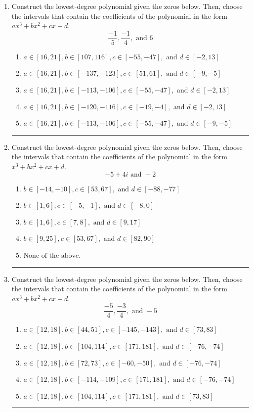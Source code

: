 \documentclass[14pt]{extbook}
\newcommand{\litem}[1]{\item#1\hspace*{-1cm}\rule{\textwidth}{0.4pt}}
\begin{document}
\begin{enumerate}
\litem{
Construct the lowest-degree polynomial given the zeros below. Then, choose the intervals that contain the coefficients of the polynomial in the form $ax^3+bx^2+cx+d$.\[ \frac{-1}{5}, \frac{-1}{4}, \text{ and } 6 \]\begin{enumerate}[label=\Alph*.]
\item \( a \in [16, 21], b \in [107, 116], c \in [-55, -47], \text{ and } d \in [-2, 13] \)
\item \( a \in [16, 21], b \in [-137, -123], c \in [51, 61], \text{ and } d \in [-9, -5] \)
\item \( a \in [16, 21], b \in [-113, -106], c \in [-55, -47], \text{ and } d \in [-2, 13] \)
\item \( a \in [16, 21], b \in [-120, -116], c \in [-19, -4], \text{ and } d \in [-2, 13] \)
\item \( a \in [16, 21], b \in [-113, -106], c \in [-55, -47], \text{ and } d \in [-9, -5] \)

\end{enumerate} }
\litem{
Construct the lowest-degree polynomial given the zeros below. Then, choose the intervals that contain the coefficients of the polynomial in the form $x^3+bx^2+cx+d$.\[ -5 + 4 i \text{ and } -2 \]\begin{enumerate}[label=\Alph*.]
\item \( b \in [-14, -10], c \in [53, 67], \text{ and } d \in [-88, -77] \)
\item \( b \in [1, 6], c \in [-5, -1], \text{ and } d \in [-8, 0] \)
\item \( b \in [1, 6], c \in [7, 8], \text{ and } d \in [9, 17] \)
\item \( b \in [9, 25], c \in [53, 67], \text{ and } d \in [82, 90] \)
\item \( \text{None of the above.} \)

\end{enumerate} }
\litem{
Construct the lowest-degree polynomial given the zeros below. Then, choose the intervals that contain the coefficients of the polynomial in the form $ax^3+bx^2+cx+d$.\[ \frac{-5}{4}, \frac{-3}{4}, \text{ and } -5 \]\begin{enumerate}[label=\Alph*.]
\item \( a \in [12, 18], b \in [44, 51], c \in [-145, -143], \text{ and } d \in [73, 83] \)
\item \( a \in [12, 18], b \in [104, 114], c \in [171, 181], \text{ and } d \in [-76, -74] \)
\item \( a \in [12, 18], b \in [72, 73], c \in [-60, -50], \text{ and } d \in [-76, -74] \)
\item \( a \in [12, 18], b \in [-114, -109], c \in [171, 181], \text{ and } d \in [-76, -74] \)
\item \( a \in [12, 18], b \in [104, 114], c \in [171, 181], \text{ and } d \in [73, 83] \)


\end{enumerate}}
\end{enumerate}
\end{document}
